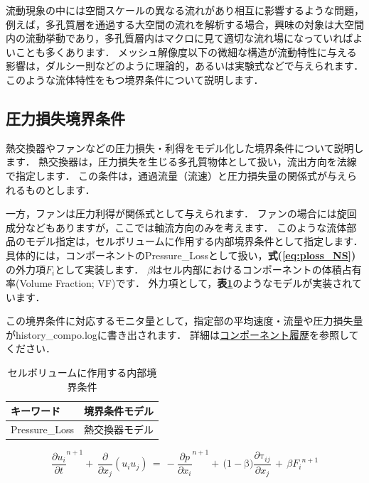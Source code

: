 流動現象の中には空間スケールの異なる流れがあり相互に影響するような問題，例えば，多孔質層を通過する大空間の流れを解析する場合，興味の対象は大空間内の流動挙動であり，多孔質層内はマクロに見て適切な流れ場になっていればよいことも多くあります．
メッシュ解像度以下の微細な構造が流動特性に与える影響は，ダルシー則などのように理論的，あるいは実験式などで与えられます．
このような流体特性をもつ境界条件について説明します．

\subsection{圧力損失境界条件}
熱交換器やファンなどの圧力損失・利得をモデル化した境界条件について説明します．
熱交換器は，圧力損失を生じる多孔質物体として扱い，流出方向を法線で指定します．
この条件は，通過流量（流速）と圧力損失量の関係式が与えられるものとします．

一方，ファンは圧力利得が関係式として与えられます．
ファンの場合には旋回成分などもありますが，ここでは軸流方向のみを考えます．
このような流体部品のモデル指定は，セルボリュームに作用する内部境界条件として指定します．
具体的には，コンポーネントのPressure\_Lossとして扱い，\textbf{式(\ref{eq:ploss_NS})}の外力項$F_{i}$として実装します．
$\beta$はセル内部におけるコンポーネントの体積占有率(Volume Fraction; VF)です．
外力項として，\textbf{表\ref{tbl:ploss_model}}のようなモデルが実装されています．

この境界条件に対応するモニタ量として，指定部の平均速度・流量や圧力損失量がhistory\_compo.logに書き出されます．
詳細は\hyperlink{tgt:history_compo}{コンポーネント履歴}を参照してください．

\begin{table}[htdp]
\caption{セルボリュームに作用する内部境界条件}
\begin{center}
\small
\begin{tabular}{ll} \toprule
キーワード & 境界条件モデル \\ \midrule
Pressure\_Loss & 熱交換器モデル \\ 
\bottomrule
\end{tabular}
\end{center}
\label{tbl:ploss_model}
\end{table}

\begin{equation}
{\frac{\partial{u}_{i}}{\partial{t}}}^{{n}{+}{1}}{+}\,\frac{\partial}{\partial{x}_{j}}\left({{u}_{i}{u}_{j}}\right)
\,{=}\,
{-}{\frac{\partial{p}}{\partial{x}_{i}}}^{{n}{+}{1}}{+}\,{(}{1}{-}\mathrm{\beta}{)}\frac{\partial{\mathrm{\tau}}_{ij}}{\partial{x}_{j}}\,{+}\,\beta {F_{i}}^{n+1}
\label{eq:ploss_NS}
\end{equation}

